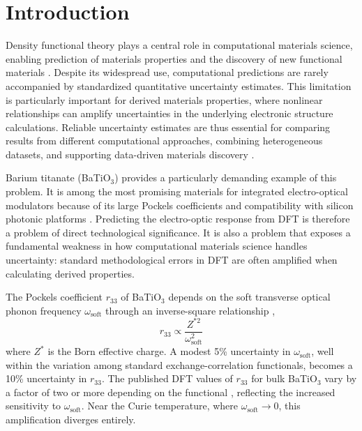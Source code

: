 \documentclass[twocolumn,superscriptaddress,amsmath,amssymb,longbibliography]{revtex4-2}
\begin{document}
\maketitle

\section{Introduction}
\label{sec:intro}

Density functional theory plays a central role in computational materials science, enabling prediction of materials properties and the discovery  of new functional materials \cite{Jain2013,Curtarolo2012,Choudhary2020}. Despite its widespread use,   computational predictions are rarely accompanied by standardized quantitative uncertainty estimates. This limitation is particularly important for derived materials properties, where nonlinear relationships can amplify uncertainties in the underlying electronic structure calculations. Reliable uncertainty estimates are thus essential for comparing  results from different computational approaches, combining heterogeneous datasets, and supporting data-driven materials discovery \cite{Wellendorff2012,Pernot2015,Pernot2020}.

Barium titanate (BaTiO$_3$) provides a particularly demanding example of this problem. It is among the most promising materials for
integrated electro-optical modulators because of its large Pockels coefficients  and compatibility with silicon photonic
platforms \cite{Abel2019,Eltes2020,Lines2001}. Predicting the
electro-optic response from DFT is therefore a problem of direct
technological significance. It is also a problem that exposes a fundamental
weakness in how computational materials science handles uncertainty: standard methodological errors in DFT are often amplified when calculating derived properties.


The Pockels coefficient $r_{33}$ of BaTiO$_3$ depends on the soft transverse
optical phonon frequency $\omega_{\mathrm{soft}}$ through an inverse-square
relationship \cite{Veithen2005},
\begin{equation}
    r_{33} \propto \frac{Z^{*2}}{\omega_{\mathrm{soft}}^2}
    \label{eq:soft_mode}
\end{equation}
 where $Z^*$ is the Born effective charge. A modest 5\%
 uncertainty in $\omega_{\mathrm{soft}}$, well within the variation among standard
exchange-correlation functionals, becomes a 10\% uncertainty in $r_{33}$.
The published DFT values of $r_{33}$ for bulk  BaTiO$_3$ vary by a factor of two or more
depending on the functional \cite{Veithen2005,Wahl2008,Bilc2008},
reflecting the increased sensitivity to $\omega_{\mathrm{soft}}$. Near the
Curie temperature, where $\omega_{\mathrm{soft}} \to 0$, this amplification
diverges entirely.
\end{document}
